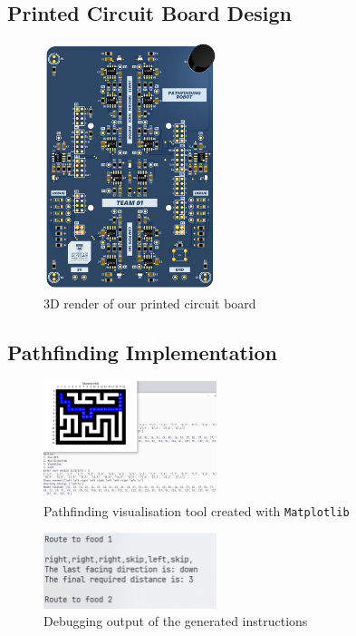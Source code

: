 \documentclass[conference]{IEEEtran}
\begin{document}
\subsection{Printed Circuit Board Design}

\begin{figure}[htbp]
	\centerline{\includegraphics[width=0.45\textwidth]{pcb.png}}
	\caption{3D render of our printed circuit board}
	\label{fig:pcb}
\end{figure}

\subsection{Pathfinding Implementation}

\begin{figure}[htbp]
	\centerline{\includegraphics[width=0.45\textwidth]{pathfinding-visualisation.png}}
	\caption{Pathfinding visualisation tool created with \texttt{Matplotlib}}
	\label{fig:pathfinding-visualisation}
\end{figure}
\begin{figure}[htbp]
	\centerline{\includegraphics[width=0.45\textwidth]{pathfinding-instructions.png}}
	\caption{Debugging output of the generated instructions}
	\label{fig:pathfinding-instructions}
\end{figure}
\end{document}
